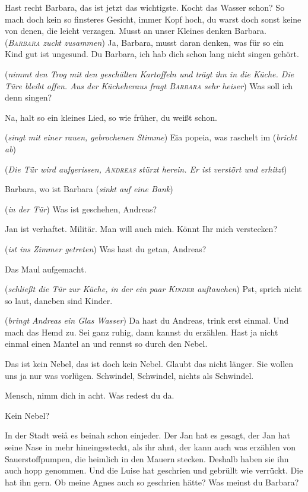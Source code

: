 \documentclass[
	final,
	a4paper,
	ngerman,
	mpinclude = true, %
	twoside = true,
	open = right,
	cleardoublepage = plain,
	DIV = 13,
	BCOR = 1cm,
	titlepage = firstiscover,
	]{scrbook}
\newcommand{\direction}[1]{(\textit{#1})}
\newcommand{\thecharacter}[1]{\textup{\textsc{#1}}\xspace}
\newcommand{\theBarbara}{\thecharacter{Barbara}}
\newcommand{\theJosef}{\thecharacter{Josef}}
\newcommand{\theAndreas}{\thecharacter{Andreas}}
\newcommand{\theKinder}{\thecharacter{Kinder}}
\newcommand{\character}[1]{\item[#1]}
\newcommand{\Barbara}{\character{\theBarbara}}
\newcommand{\Josef}{\character{\theJosef}}
\newcommand{\Andreas}{\character{\theAndreas}}
\begin{document}
\begin{play}
\Josef
Hast recht Barbara, das ist jetzt das wichtigste. Kocht das Wasser schon? So mach doch kein so finsteres Gesicht, immer Kopf hoch, du warst doch sonst keine von denen, die leicht verzagen. Musst an unser Kleines denken Barbara. \direction{\theBarbara zuckt zusammen} Ja, Barbara, musst daran denken, was für so ein Kind gut ist ungesund. Du Barbara, ich hab dich schon lang nicht singen gehört.

\Barbara \direction{nimmt den Trog mit den geschälten Kartoffeln und trägt ihn in die Küche. Die Türe bleibt offen. Aus der Kücheheraus fragt \theBarbara sehr heiser} Was soll ich denn singen?

\Josef
Na, halt so ein kleines Lied, so wie früher, du weißt schon.

\Barbara
\direction{singt mit einer rauen, gebrochenen Stimme} Eia popeia, was raschelt im \direction{bricht ab}

\direction{Die Tür wird aufgerissen, \theAndreas stürzt herein. Er ist verstört und erhitzt}

\Andreas
Barbara, wo ist Barbara \direction{sinkt auf eine Bank}

\Barbara
\direction{in der Tür} Was ist geschehen, Andreas?

\Andreas
Jan ist verhaftet. Militär. Man will auch mich. Könnt Ihr mich verstecken?

\Barbara
\direction{ist ins Zimmer getreten} Was hast du getan, Andreas?

\Andreas
Das Maul aufgemacht.

\Josef
\direction{schließt die Tür zur Küche, in der ein paar \theKinder auftauchen} Pst, sprich nicht so laut, daneben sind Kinder.

\Barbara
\direction{bringt Andreas ein Glas Wasser} Da hast du Andreas, trink erst einmal. Und mach das Hemd zu. Sei ganz ruhig, dann kannst du erzählen. Hast ja nicht einmal einen Mantel an und rennst so durch den Nebel.

\Andreas
Das ist kein Nebel, das ist doch kein Nebel. Glaubt das nicht länger. Sie wollen uns ja nur was vorlügen. Schwindel, Schwindel, nichts als Schwindel.

\Josef
Mensch, nimm dich in acht. Was redest du da.

\Barbara
Kein Nebel?

\Andreas
In der Stadt weiå es beinah schon einjeder. Der Jan hat es gesagt, der Jan hat seine Nase in mehr hineingesteckt, als ihr ahnt, der kann auch was erzählen von Sauerstoffpumpen, die heimlich in den Mauern stecken. Deshalb haben sie ihn auch hopp genommen. Und die Luise hat geschrien und gebrüllt wie verrückt. Die hat ihn gern. Ob meine Agnes auch so geschrien hätte? Was meinst du Barbara?


\end{play}
\end{document}
